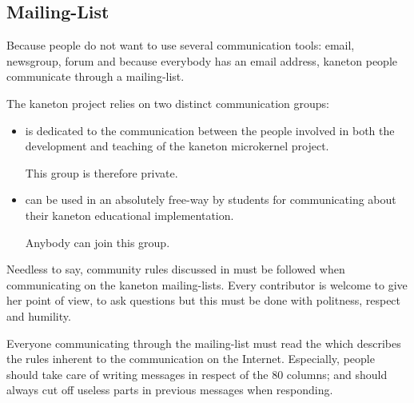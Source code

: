 %
%
%
%
%
%

%
%

\subsection{Mailing-List}
\label{section:mailing-list}

Because people do not want to use several communication tools: email,
newsgroup, forum \etc{} and because everybody has an email address,
kaneton people communicate through a mailing-list.

The kaneton project relies on two distinct communication groups:

\begin{itemize}
  \item
     is dedicated to the communication
    between the people involved in both the development and teaching of the
    kaneton microkernel project.

    \-

    This group is therefore private.
  \item
     can be used in an absolutely free-way by
    students for communicating about their kaneton educational implementation.

    \-

    Anybody can join this group.
\end{itemize}

Needless to say, community rules discussed in  must be followed when communicating on the kaneton
mailing-lists. Every contributor is welcome to give her point of view, to
ask questions \etc{} but this must be done with politness, respect and
humility.

Everyone communicating through the mailing-list must read the
 which describes the rules inherent to the communication
on the Internet. Especially, people should take care of writing messages in
respect of the $80$ columns; and should always cut off useless parts
in previous messages when responding.

